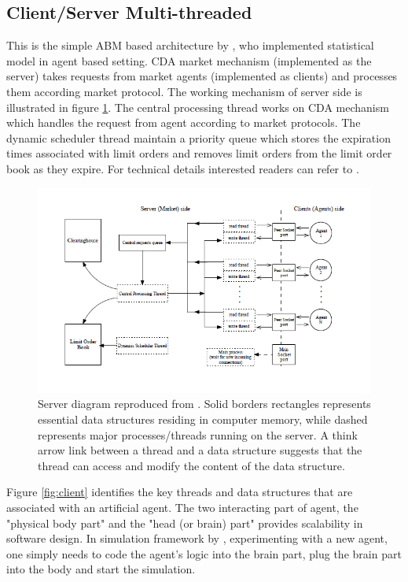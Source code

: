 \documentclass[12pt,a4paper]{article}
\numberwithin{equation}{section}
\numberwithin{figure}{section}
\numberwithin{table}{section}
\begin{document}
\subsection{Client/Server Multi-threaded}
This is the simple ABM based architecture by \citet{guo2005}, who implemented \citet{SmithFarmerGillemotKrishnamurty2003} statistical model in agent based setting. CDA market mechanism (implemented as the server) takes requests from market agents (implemented as clients) and processes them according market protocol. The working mechanism of server side is illustrated in figure \ref{fig:server}. The central processing thread works on CDA mechanism which handles the request from agent according to market protocols. The dynamic scheduler thread maintain a priority queue which stores the expiration times associated with limit orders and removes limit orders from the limit order book as they expire. For technical details interested readers can refer to \citet{guo2005}. 

\begin{figure}[ht]
\begin{center}
\includegraphics[width=\textwidth]{SERVER}
\caption{Server diagram reproduced from \citet{guo2005}. Solid borders rectangles represents essential data structures residing in computer memory, while dashed represents major processes/threads running on the server. A think arrow link between a thread and a data structure suggests that the thread can access and modify the content of the data structure.}
\label{fig:server}
\end{center}
\end{figure}

Figure \ref{fig:client} identifies the key threads and data structures that are associated with an artificial agent. The two interacting part of agent, the "physical body part" and the "head (or brain) part" provides  scalability in software design. In simulation framework by \citet{guo2005}, experimenting with a new agent, one simply
needs to code the agent's logic into the brain part, plug the brain part into the body and start the simulation.
\end{document}
